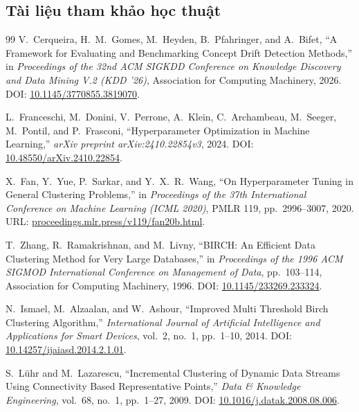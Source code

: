 \subsection*{Tài liệu tham khảo học thuật}
\begin{thebibliography}{99}
\small
{}
V.~Cerqueira, H.~M.~Gomes, M.~Heyden, B.~Pfahringer, and A.~Bifet,
\newblock ``A Framework for Evaluating and Benchmarking Concept Drift Detection Methods,''
\newblock in \emph{Proceedings of the 32nd ACM SIGKDD Conference on Knowledge Discovery and Data Mining V.2 (KDD '26)}, Association for Computing Machinery, 2026.
\newblock DOI: \href{https://doi.org/10.1145/3770855.3819070}{10.1145/3770855.3819070}.

L.~Franceschi, M.~Donini, V.~Perrone, A.~Klein, C.~Archambeau, M.~Seeger, M.~Pontil, and P.~Frasconi,
\newblock ``Hyperparameter Optimization in Machine Learning,''
\newblock \emph{arXiv preprint arXiv:2410.22854v3}, 2024.
\newblock DOI: \href{https://doi.org/10.48550/arXiv.2410.22854}{10.48550/arXiv.2410.22854}.

X.~Fan, Y.~Yue, P.~Sarkar, and Y.~X.~R.~Wang,
\newblock ``On Hyperparameter Tuning in General Clustering Problems,''
\newblock in \emph{Proceedings of the 37th International Conference on Machine Learning (ICML 2020)}, PMLR 119, pp.~2996--3007, 2020.
\newblock URL: \href{https://proceedings.mlr.press/v119/fan20b.html}{proceedings.mlr.press/v119/fan20b.html}.

T.~Zhang, R.~Ramakrishnan, and M.~Livny,
\newblock ``BIRCH: An Efficient Data Clustering Method for Very Large Databases,''
\newblock in \emph{Proceedings of the 1996 ACM SIGMOD International Conference on Management of Data}, pp.~103--114, Association for Computing Machinery, 1996.
\newblock DOI: \href{https://doi.org/10.1145/233269.233324}{10.1145/233269.233324}.

N.~Ismael, M.~Alzaalan, and W.~Ashour,
\newblock ``Improved Multi Threshold Birch Clustering Algorithm,''
\newblock \emph{International Journal of Artificial Intelligence and Applications for Smart Devices}, vol.~2, no.~1, pp.~1--10, 2014.
\newblock DOI: \href{https://doi.org/10.14257/ijaiasd.2014.2.1.01}{10.14257/ijaiasd.2014.2.1.01}.

S.~L{\"u}hr and M.~Lazarescu,
\newblock ``Incremental Clustering of Dynamic Data Streams Using Connectivity Based Representative Points,''
\newblock \emph{Data \& Knowledge Engineering}, vol.~68, no.~1, pp.~1--27, 2009.
\newblock DOI: \href{https://doi.org/10.1016/j.datak.2008.08.006}{10.1016/j.datak.2008.08.006}.


\end{thebibliography}
